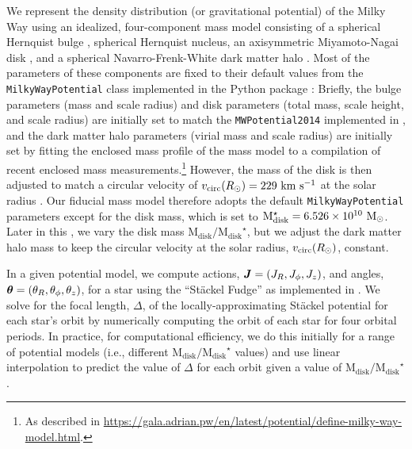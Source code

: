 \documentclass[modern]{aastex63}
\newcommand{\mdisk}{\ensuremath{\mathrm{M}_\mathrm{disk}}}
\newcommand{\mratio}{\ensuremath{\mdisk / \mdisk^\star}}
\begin{document}
We represent the density distribution (or gravitational potential) of the
Milky Way using an idealized, four-component mass model consisting of a
spherical Hernquist bulge \citep{Hernquist:1990}, spherical Hernquist nucleus,
an axisymmetric Miyamoto-Nagai disk \citep{Miyamoto:1975}, and a spherical
Navarro-Frenk-White dark matter halo \citep{Navarro:1996}.
Most of the parameters of these components are fixed to their default values
from the \texttt{MilkyWayPotential} class implemented in the 
Python package \citep[v1.2;][]{gala}:
Briefly, the bulge parameters (mass and scale radius) and disk parameters (total
mass, scale height, and scale radius) are initially set to match the
\texttt{MWPotential2014} implemented in  \citep{Bovy:2015}, and
the dark matter halo parameters (virial mass and scale radius) are initially set
by fitting the enclosed mass profile of the mass model to a compilation of
recent enclosed mass measurements.\footnote{As described in
\url{https://gala.adrian.pw/en/latest/potential/define-milky-way-model.html}.}
However, the mass of the disk is then adjusted to match a circular velocity of
$v_{\rm circ}(R_\odot) = 229~\mathrm{km}~\mathrm{s}^{-1}$ at the solar radius \citep{Eilers:2019}.
Our fiducial mass model therefore adopts the default \texttt{MilkyWayPotential}
parameters except for the disk mass, which is set to $\mdisk^\star = 6.526
\times 10^{10}~\Msun$.
Later in this \documentname, we vary the disk mass \mratio, but we adjust the
dark matter halo mass to keep the circular velocity at the solar radius, $v_{\rm
circ}(R_\odot)$, constant.

In a given potential model, we compute actions, $\boldsymbol{J} = (J_R, J_\phi, J_z)$,
and angles, $\boldsymbol{\theta} = (\theta_R, \theta_\phi, \theta_z)$, for a star using
the ``St\"ackel Fudge'' \citep{Binney:2012, Sanders:2012} as implemented in
 \citep{Bovy:2015}.
We solve for the focal length, $\Delta$, of the locally-approximating St\"ackel
potential for each star's orbit by numerically computing the orbit of each star
for four orbital periods.
In practice, for computational efficiency, we do this initially for a range of
potential models (i.e., different $\mratio$ values) and use linear interpolation
to predict the value of $\Delta$ for each orbit given a value of $\mratio$.
\end{document}
